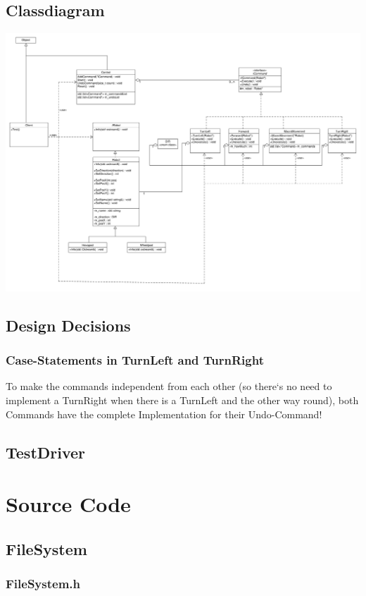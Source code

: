 \subsection{Classdiagram}
\includegraphics[scale=1, angle=90]{../ClassDiagram.pdf}

\subsection{Design Decisions}
\subsubsection{Case-Statements in TurnLeft and TurnRight}
To make the commands independent from each other (so there`s no need to implement a TurnRight when there is a TurnLeft and the other way round), both Commands have the complete Implementation for their Undo-Command!




\subsection{TestDriver}
\newpage

\section{Source Code}

\subsection{FileSystem}
\subsubsection{FileSystem.h}
